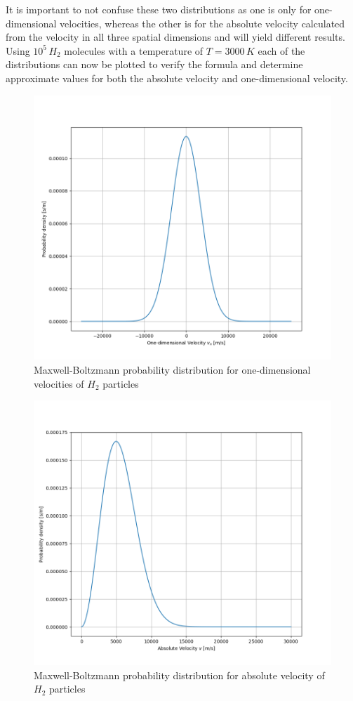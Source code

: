 \documentclass[reprint,english,notitlepage]{revtex4-2}
\begin{document}
It is important to not confuse these two distributions as one is only for one-dimensional velocities, whereas the other is for the absolute velocity calculated from the velocity in all three spatial dimensions and will yield different results.
Using $10^5\,H_2$ molecules with a temperature of $T=3000\,K$ each of the distributions can now be plotted to verify the formula and determine approximate values for both the absolute velocity and one-dimensional velocity.
\begin{figure}[h]
	\centering
	\includegraphics[scale=0.3]{./Figures/Max-Boltz1}
	\caption{Maxwell-Boltzmann probability distribution for one-dimensional velocities of $H_{2}$ particles}\label{fig:Max_Boltz1D_Plot}
\end{figure}
\begin{figure}[h]
	\centering
	\includegraphics[scale=0.3]{./Figures/Max-Boltz3}
	\caption{Maxwell-Boltzmann probability distribution for absolute velocity of $H_{2}$ particles}\label{fig:Max_Boltz3D_Plot}
\end{figure}
\end{document}
